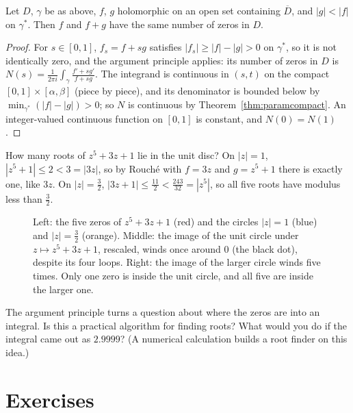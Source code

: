 \begin{theorem}[Rouch\'e]\label{thm:rouche}
Let $D$, $\gamma$ be as above, $f$, $g$ holomorphic on an open set containing $\overline D$, and $|g|<|f|$ on $\gamma^*$. Then $f$ and $f+g$ have the same
number of zeros in $D$.
\end{theorem}
\begin{proof}
For $s\in[0,1]$, $f_s=f+sg$ satisfies $|f_s|\ge|f|-|g|>0$ on $\gamma^*$, so it is not identically zero, and the argument principle applies: its number of
zeros in $D$ is $N(s)=\frac1{2\pi i}\int_\gamma\frac{f'+sg'}{f+sg}$. The integrand is continuous in $(s,t)$ on the compact $[0,1]\times[\alpha,\beta]$ (piece by piece), and its
denominator is bounded below by $\min_{\gamma^*}(|f|-|g|)>0$; so $N$ is continuous by Theorem~\ref{thm:paramcompact}. An integer-valued continuous function on
$[0,1]$ is constant, and $N(0)=N(1)$.
\end{proof}

\begin{example}
How many roots of $z^5+3z+1$ lie in the unit disc? On $|z|=1$, $|z^5+1|\le2<3=|3z|$, so by Rouch\'e with $f=3z$ and $g=z^5+1$ there is exactly
one, like $3z$. On $|z|=\frac32$, $|3z+1|\le\frac{11}2<\frac{243}{32}=|z^5|$, so all five roots have modulus less than $\frac32$.
\end{example}

\begin{figure}[ht]
\centering
{}
\caption{Left: the five zeros of $z^5+3z+1$ (red) and the circles $|z|=1$ (blue) and $|z|=\frac32$ (orange). Middle: the image of the unit circle
under $z\mapsto z^5+3z+1$, rescaled, winds once around $0$ (the black dot), despite its four loops. Right: the image of the larger circle winds
five times. Only one zero is inside the unit circle, and all five are inside the larger one.}
\label{fig:winding}
\end{figure}

\begin{think}
The argument principle turns a question about where the zeros are into an integral. Is this a practical algorithm for finding
roots? What would you do if the integral came out as $2.9999$? (A numerical calculation builds a root finder on this idea.)
\end{think}

\section{Exercises}

